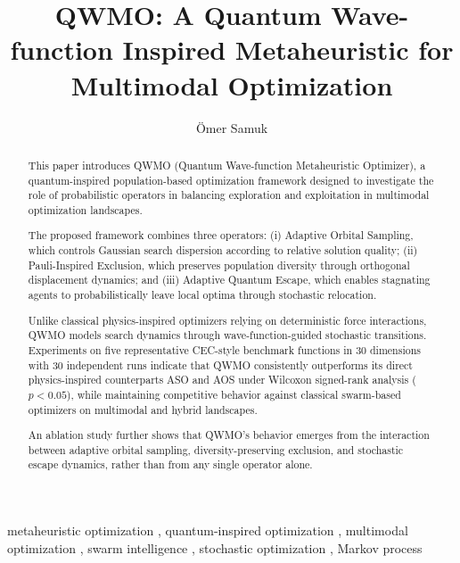 \documentclass[final,5p,times,twocolumn]{elsarticle}
\begin{document}
\begin{frontmatter}

\title{
QWMO: A Quantum Wave-function Inspired Metaheuristic
for Multimodal Optimization
}

\author[inst1]{Ömer Samuk}



\begin{abstract}

This paper introduces QWMO
(Quantum Wave-function Metaheuristic Optimizer),
a quantum-inspired population-based optimization framework
designed to investigate the role of probabilistic operators
in balancing exploration and exploitation in multimodal
optimization landscapes.

The proposed framework combines three operators:
(i) Adaptive Orbital Sampling, which controls Gaussian
search dispersion according to relative solution quality;
(ii) Pauli-Inspired Exclusion, which preserves population
diversity through orthogonal displacement dynamics; and
(iii) Adaptive Quantum Escape, which enables stagnating
agents to probabilistically leave local optima through
stochastic relocation.

Unlike classical physics-inspired optimizers relying on
deterministic force interactions, QWMO models search
dynamics through wave-function-guided stochastic transitions.
Experiments on five representative CEC-style benchmark
functions in 30 dimensions with 30 independent runs indicate
that QWMO consistently outperforms its direct physics-inspired
counterparts ASO and AOS under Wilcoxon signed-rank analysis
($p<0.05$), while maintaining competitive behavior against
classical swarm-based optimizers on multimodal and hybrid
landscapes.

An ablation study further shows that QWMO's behavior emerges
from the interaction between adaptive orbital sampling,
diversity-preserving exclusion, and stochastic escape dynamics,
rather than from any single operator alone.

\end{abstract}

\begin{keyword}
metaheuristic optimization \sep
quantum-inspired optimization \sep
multimodal optimization \sep
swarm intelligence \sep
stochastic optimization \sep
Markov process
\end{keyword}

\end{frontmatter}
\end{document}

